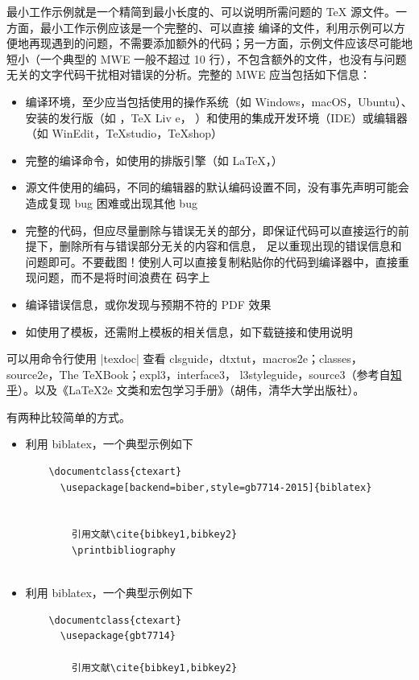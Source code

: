 最小工作示例就是一个精简到最小长度的、可以说明所需问题的 \TeX{} 源文件。一方面，最小工作示例应该是一个完整的、可以直接
编译的文件，利用示例可以方便地再现遇到的问题，不需要添加额外的代码；另一方面，示例文件应该尽可能地短小（一个典型的 MWE
一般不超过 10 行），不包含额外的文件，也没有与问题无关的文字代码干扰相对错误的分析。完整的 MWE 应当包括如下信息：
\begin{itemize}
  \item 编译环境，至少应当包括使用的操作系统（如 Windows，macOS，Ubuntu）、安装的发行版（如 \CTeX{}，\TeX{} Liv
  e，\MacTeX{} ）和使用的集成开发环境（IDE）或编辑器（如 WinEdit，TeXstudio，TeXshop）
  \item 完整的编译命令，如使用的排版引擎（如 \LaTeX{}，\XeLaTeX{}）
  \item 源文件使用的编码，不同的编辑器的默认编码设置不同，没有事先声明可能会造成复现 bug 困难或出现其他 bug
  \item 完整的代码，但应尽量删除与错误无关的部分，即保证代码可以直接运行的前提下，删除所有与错误部分无关的内容和信息，
  足以重现出现的错误信息和问题即可。不要截图！使别人可以直接复制粘贴你的代码到编译器中，直接重现问题，而不是将时间浪费在
  码字上
  \item 编译错误信息，或你发现与预期不符的 PDF 效果
  \item 如使用了模板，还需附上模板的相关信息，如下载链接和使用说明
\end{itemize}



可以用命令行使用 |texdoc| 查看 clsguide，dtxtut，macros2e；classes，source2e，The TeXBook；expl3，interface3，
l3styleguide，source3（参考自\href{https://www.zhihu.com/question/27017364}{知乎}）。以及《\LaTeX{2e}
文类和宏包学习手册》（胡伟，清华大学出版社）。









有两种比较简单的方式。
\begin{itemize}
  \item 利用 biblatex，一个典型示例如下
  \begin{verbatim}
    \documentclass{ctexart}
      \usepackage[backend=biber,style=gb7714-2015]{biblatex}
      
      
        引用文献\cite{bibkey1,bibkey2}
        \printbibliography
      
    \end{verbatim}
  \item 利用 biblatex，一个典型示例如下
  \begin{verbatim}
    \documentclass{ctexart}
      \usepackage{gbt7714}
      
        引用文献\cite{bibkey1,bibkey2}
        
      
  \end{verbatim}
\end{itemize}


